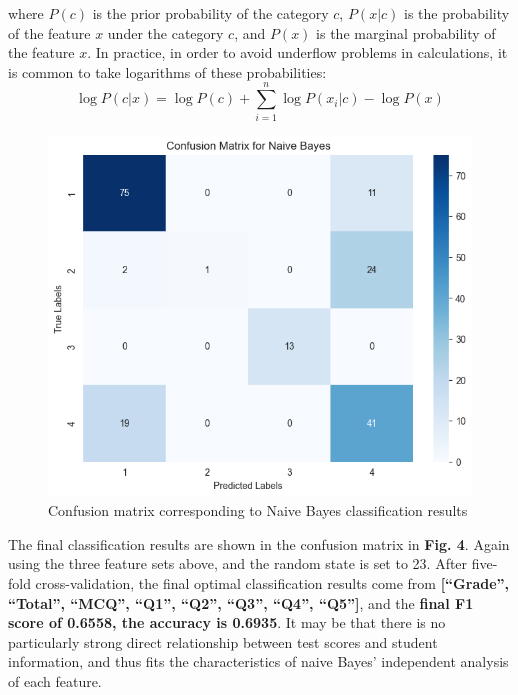 \documentclass[twocolumn]{IEEEtran}
\begin{document}
where \(P(c) \) is the prior probability of the category \(c \), \(P(x|c) \) is the probability of the feature \(x \) under the category \(c \), and \(P(x) \) is the marginal probability of the feature \(x \). In practice, in order to avoid underflow problems in calculations, it is common to take logarithms of these probabilities:
\begin{equation}
    \log P(c|x) = \log P(c) + \sum_{i=1}^n \log P(x_i|c) - \log P(x)
\end{equation}
\begin{figure}[H]
    \centering %
    \includegraphics[scale=0.3]{./img/nb_matrix.png}
    \caption{Confusion matrix corresponding to Naive Bayes classification results}
\end{figure}

The final classification results are shown in the confusion matrix in \textbf{Fig. 4}. Again using the three feature sets above, and the random state is set to 23. After five-fold cross-validation, the final optimal classification results come from \textbf{[``Grade'', ``Total'', ``MCQ'', ``Q1'', ``Q2'', ``Q3'', ``Q4'', ``Q5'']}, and the \textbf{final F1 score of 0.6558, the accuracy is 0.6935}. It may be that there is no particularly strong direct relationship between test scores and student information, and thus fits the characteristics of naive Bayes' independent analysis of each feature.

\end{document}
